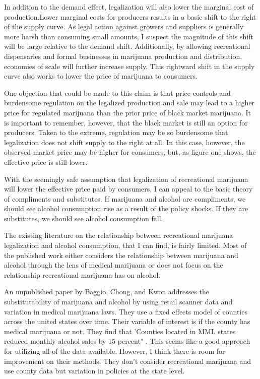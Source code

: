 \documentclass[11pt]{article}
\begin{document}
In addition to the demand effect, legalization will also lower the marginal cost of production.Lower marginal costs for producers results in a basic shift to the right of the supply curve. As legal action against growers and suppliers is generally more harsh than consuming small amounts, I suspect the magnitude of this shift will be large relative to the demand shift. Additionally, by allowing recreational dispensaries and formal businesses in marijuana production and distribution, economies of scale will further increase supply. This rightward shift in the supply curve also works to lower the price of marijuana to consumers. \par

One objection that could be made to this claim is that price controls and burdensome regulation on the legalized production and sale may lead to a higher price for regulated marijuana than the prior price of black market marijuana. It is important to remember, however, that the black market is still an option for producers. Taken to the extreme, regulation may be so burdensome that legalization does not shift supply to the right at all. In this case, however, the observed market price may be higher for consumers, but, as figure one shows, the effective price is still lower.\par

With the seemingly safe assumption that legalization of recreational marijuana will lower the effective price paid by consumers, I can appeal to the basic theory of compliments and substitutes. If marijuana and alcohol are compliments, we should see alcohol consumption rise as a result of the policy shocks. If they are substitutes, we should see alcohol consumption fall.\par

The existing literature on the relationship between recreational marijuana legalization and alcohol consumption, that I can find, is fairly limited. Most of the published work either considers the relationship between marijuana and alcohol through the lens of medical marijuana or does not focus on the relationship recreational marijuana has on alcohol.\par 

An unpublished paper by Baggio, Chong, and Kwon addresses the substitutability of marijuana and alcohol by using retail scanner data and variation in medical marijuana laws. They use a fixed effects model of counties across the united states over time. Their variable of interest is if the county has medical marijuana or not. They find that 'Counties located in MML states
reduced monthly alcohol sales by 15 percent" \cite{baggio_chong_kwon_2018}. This seems like a good approach for utilizing all of the data available. However, I think there is room for improvement on their methods. They don't consider recreational marijuana and use county data but variation in policies at the state level.  \par
\end{document}
